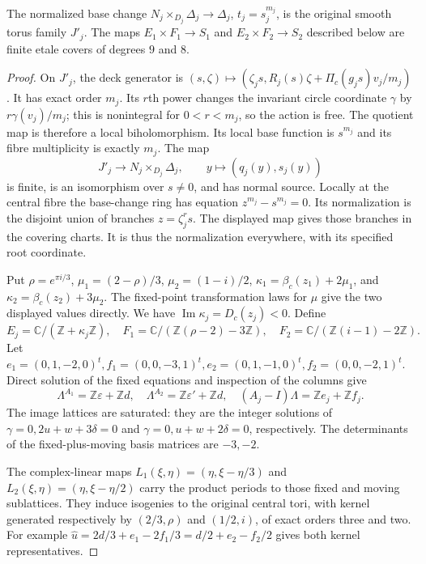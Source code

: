 \begin{proposition}[A.1.2; Proved]\label{st:A.1.2}
The normalized base change $N_j\times_{D_j}\Delta_j\to\Delta_j$, $t_j=s_j^{m_j}$, is the original smooth torus family $J'_j$. The maps $E_1\times F_1\to S_1$ and $E_2\times F_2\to S_2$ described below are finite etale covers of degrees $9$ and $8$.
\end{proposition}
\begin{proof}
On $J'_j$, the deck generator is
$(s,\zeta)\mapsto(\zeta_js,R_j(s)\zeta+\Pi_c(g_js)v_j/m_j)$. It has exact order $m_j$. Its $r$th power changes the invariant circle coordinate $\gamma$ by $r\gamma(v_j)/m_j$; this is nonintegral for $0<r<m_j$, so the action is free. The quotient map is therefore a local biholomorphism. Its local base function is $s^{m_j}$ and its fibre multiplicity is exactly $m_j$. The map
\[
 J'_j\longrightarrow N_j\times_{D_j}\Delta_j,\qquad y\longmapsto(q_j(y),s_j(y))
\]
is finite, is an isomorphism over $s\ne0$, and has normal source. Locally at the central fibre the base-change ring has equation $z^{m_j}-s^{m_j}=0$. Its normalization is the disjoint union of branches $z=\zeta_j^rs$. The displayed map gives those branches in the covering charts. It is thus the normalization everywhere, with its specified root coordinate.

Put $\rho=e^{\pi i/3}$, $\mu_1=(2-\rho)/3$, $\mu_2=(1-i)/2$, $\kappa_1=\beta_c(z_1)+2\mu_1$, and $\kappa_2=\beta_c(z_2)+3\mu_2$. The fixed-point transformation laws for $\mu$ give the two displayed values directly. We have $\operatorname{Im}\kappa_j=D_c(z_j)<0$. Define
\[
 E_j=\mathbb C/(\mathbb Z+\kappa_j\mathbb Z),\quad
 F_1=\mathbb C/(\mathbb Z(\rho-2)-3\mathbb Z),\quad
 F_2=\mathbb C/(\mathbb Z(i-1)-2\mathbb Z).
\]
Let $e_1=(0,1,-2,0)^t,f_1=(0,0,-3,1)^t,e_2=(0,1,-1,0)^t,f_2=(0,0,-2,1)^t$. Direct solution of the fixed equations and inspection of the columns give
\[
 \Lambda^{A_1}=\mathbb Z\varepsilon+\mathbb Zd,\quad
 \Lambda^{A_2}=\mathbb Z\varepsilon'+\mathbb Zd,\quad
 (A_j-I)\Lambda=\mathbb Ze_j+\mathbb Zf_j.
\]
The image lattices are saturated: they are the integer solutions of $\gamma=0,2u+w+3\delta=0$ and $\gamma=0,u+w+2\delta=0$, respectively. The determinants of the fixed-plus-moving basis matrices are $-3,-2$.

The complex-linear maps $L_1(\xi,\eta)=(\eta,\xi-\eta/3)$ and $L_2(\xi,\eta)=(\eta,\xi-\eta/2)$ carry the product periods to those fixed and moving sublattices. They induce isogenies to the original central tori, with kernel generated respectively by $(2/3,\rho)$ and $(1/2,i)$, of exact orders three and two. For example $\widehat u=2d/3+e_1-2f_1/3=d/2+e_2-f_2/2$ gives both kernel representatives.


\end{proof}
